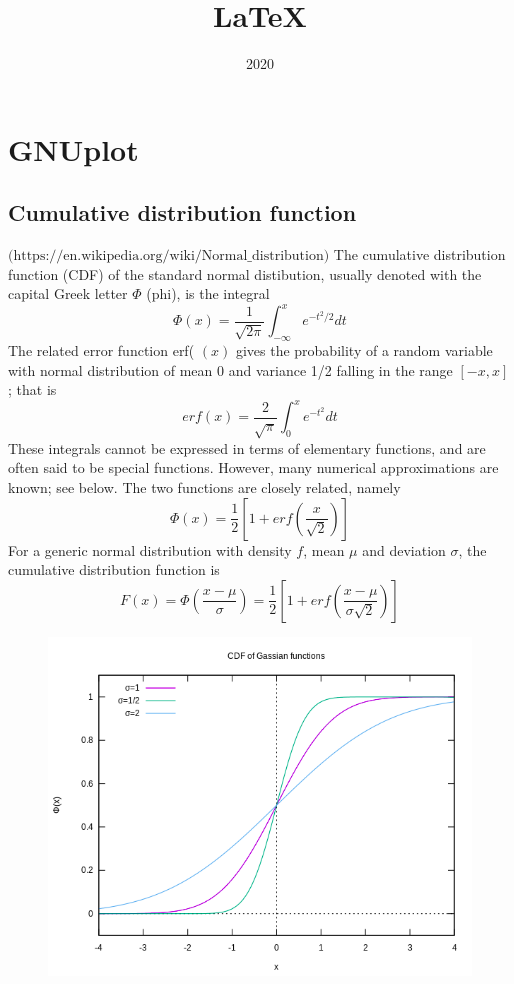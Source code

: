 \documentclass{article}
\title{LaTeX}
\date{2020}
\begin{document}
\section*{GNUplot}

\subsection*{Cumulative distribution function}
$\text{(https://en.wikipedia.org/wiki/Normal\_distribution)}$
\newline
The cumulative distribution function (CDF) of the standard normal distibution, usually denoted with the capital Greek letter $\Phi$ (phi), is the integral $$ \Phi(x)=\frac{1}{\sqrt{2 \pi}} \int_{-\infty}^{x} e^{-t^{2} / 2} d t $$ The related error function erf( $(x)$ gives the probability of a random variable with normal distribution of mean 0 and variance 1/2 falling in the range $[-x, x]$; that is $$ {erf}(x)=\frac{2}{\sqrt{\pi}} \int_{0}^{x} e^{-t^{2}} d t $$ These integrals cannot be expressed in terms of elementary functions, and are often said to be special functions. However, many numerical approximations are known; see below. The two functions are closely related, namely $$ \Phi(x)=\frac{1}{2}\left[1+{erf}\left(\frac{x}{\sqrt{2}}\right)\right] $$ For a generic normal distribution with density $f$, mean $\mu$ and deviation $\sigma$, the cumulative distribution function is $$ F(x)=\Phi\left(\frac{x-\mu}{\sigma}\right)=\frac{1}{2}\left[1+{erf}\left(\frac{x-\mu}{\sigma \sqrt{2}}\right)\right] $$
\begin{figure}[h]
	\centering
	\includegraphics[width=0.7\linewidth]{CDF}
	\caption{}
	\label{fig:cdf}
\end{figure}
 
\end{document}
